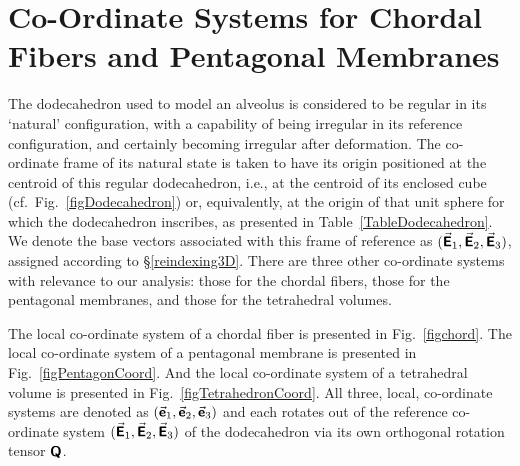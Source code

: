 \section{Co-Ordinate Systems for Chordal Fibers and Pentagonal Membranes}

The dodecahedron used to model an alveolus is considered to be regular in its `natural' configuration, with a capability of being irregular in its reference configuration, and certainly becoming irregular after deformation.  The co-ordinate frame of its natural state is taken to have its origin positioned at the centroid of this regular dodecahedron, i.e., at the centroid of its enclosed cube (cf.\ Fig.~\ref{figDodecahedron}) or, equivalently, at the origin of that unit sphere for which the dodecahedron inscribes, as presented in Table~\ref{TableDodecahedron}.  We denote the base vectors associated with this frame of reference as $( \vec{\boldsymbol{\mathsf{E}}}_1 , \vec{\boldsymbol{\mathsf{E}}}_2 , \vec{\boldsymbol{\mathsf{E}}}_3 )$, assigned according to \S\ref{reindexing3D}.  There are three other co-ordinate systems with relevance to our analysis: those for the chordal fibers, those for the pentagonal membranes, and those for the tetrahedral volumes.

The local co-ordinate system of a chordal fiber is presented in Fig.~\ref{figchord}. The local co-ordinate system of a pentagonal membrane is presented in Fig.~\ref{figPentagonCoord}.  And the local co-ordinate system of a tetrahedral volume is presented in Fig.~\ref{figTetrahedronCoord}.  All three, local, co-ordinate systems are denoted as $( \vec{\boldsymbol{\mathsf{e}}}_1 , \vec{\boldsymbol{\mathsf{e}}}_2 , \vec{\boldsymbol{\mathsf{e}}}_3 )$ and each rotates out of the reference co-ordinate system $( \vec{\boldsymbol{\mathsf{E}}}_1 , \vec{\boldsymbol{\mathsf{E}}}_2 , \vec{\boldsymbol{\mathsf{E}}}_3 )$ of the dodecahedron via its own orthogonal rotation tensor $\boldsymbol{\mathsf{Q}}$.

